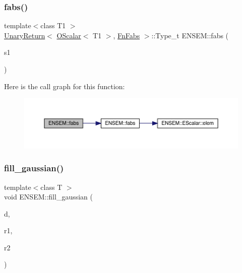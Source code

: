 \subsubsection{\texorpdfstring{fabs()}{fabs()}}
{\footnotesize\ttfamily template$<$class T1 $>$ \\
\mbox{\hyperlink{structENSEM_1_1UnaryReturn}{Unary\+Return}}$<$ \mbox{\hyperlink{classENSEM_1_1OScalar}{O\+Scalar}}$<$ T1 $>$, \mbox{\hyperlink{structENSEM_1_1FnFabs}{Fn\+Fabs}} $>$\+::Type\+\_\+t E\+N\+S\+E\+M\+::fabs (\begin{DoxyParamCaption}\item[{const \mbox{\hyperlink{classENSEM_1_1OScalar}{O\+Scalar}}$<$ T1 $>$ \&}]{s1 }\end{DoxyParamCaption})\hspace{0.3cm}{\ttfamily [inline]}}

Here is the call graph for this function\+:\nopagebreak
\begin{figure}[H]
\begin{center}
\leavevmode
\includegraphics[width=350pt]{d1/d71/group__obsscalar_gaab3ff43b1817abbbfb1caf2c90110a0f_cgraph}
\end{center}
\end{figure}
\mbox{\label{group__obsscalar_gaf665bb772c121b0cab02a5f3244b4c3d}} 
\subsubsection{\texorpdfstring{fill\_gaussian()}{fill\_gaussian()}}
{\footnotesize\ttfamily template$<$class T $>$ \\
void E\+N\+S\+E\+M\+::fill\+\_\+gaussian (\begin{DoxyParamCaption}\item[{\mbox{\hyperlink{classENSEM_1_1OScalar}{O\+Scalar}}$<$ T $>$ \&}]{d,  }\item[{\mbox{\hyperlink{classENSEM_1_1OScalar}{O\+Scalar}}$<$ T $>$ \&}]{r1,  }\item[{\mbox{\hyperlink{classENSEM_1_1OScalar}{O\+Scalar}}$<$ T $>$ \&}]{r2 }\end{DoxyParamCaption})\hspace{0.3cm}{\ttfamily [inline]}}



